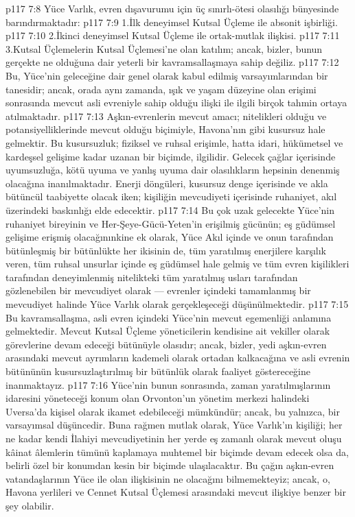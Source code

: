 \vs p117 7:8 Yüce Varlık, evren dışavurumu için üç sınırlı\hyp{}ötesi olasılığı bünyesinde barındırmaktadır:
\vs p117 7:9 1.\bibnobreakspace İlk deneyimsel Kutsal Üçleme ile absonit işbirliği.
\vs p117 7:10 2.\bibnobreakspace İkinci deneyimsel Kutsal Üçleme ile ortak\hyp{}mutlak ilişkisi.
\vs p117 7:11 3.\bibnobreakspace Kutsal Üçlemelerin Kutsal Üçlemesi’ne olan katılım; ancak, bizler, bunun gerçekte ne olduğuna dair yeterli bir kavramsallaşmaya sahip değiliz.
\vs p117 7:12 Bu, Yüce’nin geleceğine dair genel olarak kabul edilmiş varsayımlarından bir tanesidir; ancak, orada aynı zamanda, ışık ve yaşam düzeyine olan erişimi sonrasında mevcut asli evreniyle sahip olduğu ilişki ile ilgili birçok tahmin ortaya atılmaktadır.
\vs p117 7:13 Aşkın\hyp{}evrenlerin mevcut amacı; nitelikleri olduğu ve potansiyelliklerinde mevcut olduğu biçimiyle, Havona’nın gibi kusursuz hale gelmektir. Bu kusursuzluk; fiziksel ve ruhsal erişimle, hatta idari, hükümetsel ve kardeşsel gelişime kadar uzanan bir biçimde, ilgilidir. Gelecek çağlar içerisinde uyumsuzluğa, kötü uyuma ve yanlış uyuma dair olasılıkların hepsinin denenmiş olacağına inanılmaktadır. Enerji döngüleri, kusursuz denge içerisinde ve akla bütüncül taabiyette olacak iken; kişiliğin mevcudiyeti içerisinde ruhaniyet, akıl üzerindeki baskınlığı elde edecektir.
\vs p117 7:14 Bu çok uzak gelecekte Yüce’nin ruhaniyet bireyinin ve Her\hyp{}Şeye\hyp{}Gücü\hyp{}Yeten’in erişilmiş gücünün; eş güdümsel gelişime erişmiş olacağınınkine ek olarak, Yüce Akıl içinde ve onun tarafından bütünleşmiş bir bütünlükte her ikisinin de, tüm yaratılmış enerjilere karşılık veren, tüm ruhsal unsurlar içinde eş güdümsel hale gelmiş ve tüm evren kişilikleri tarafından deneyimlenmiş nitelikteki tüm yaratılmış usları tarafından gözlenebilen bir mevcudiyet olarak --- evrenler içindeki tamamlanmış bir mevcudiyet halinde Yüce Varlık olarak gerçekleşeceği düşünülmektedir.
\vs p117 7:15 Bu kavramsallaşma, asli evren içindeki Yüce’nin mevcut egemenliği anlamına gelmektedir. Mevcut Kutsal Üçleme yöneticilerin kendisine ait vekiller olarak görevlerine devam edeceği bütünüyle olasıdır; ancak, bizler, yedi aşkın\hyp{}evren arasındaki mevcut ayrımların kademeli olarak ortadan kalkacağına ve asli evrenin bütününün kusursuzlaştırılmış bir bütünlük olarak faaliyet göstereceğine inanmaktayız.
\vs p117 7:16 Yüce’nin bunun sonrasında, zaman yaratılmışlarının idaresini yöneteceği konum olan Orvonton’un yönetim merkezi halindeki Uversa’da kişisel olarak ikamet edebileceği mümkündür; ancak, bu yalnızca, bir varsayımsal düşüncedir. Buna rağmen mutlak olarak, Yüce Varlık’ın kişiliği; her ne kadar kendi İlahiyi mevcudiyetinin her yerde eş zamanlı olarak mevcut oluşu kâinat âlemlerin tümünü kaplamaya muhtemel bir biçimde devam edecek olsa da, belirli özel bir konumdan kesin bir biçimde ulaşılacaktır. Bu çağın aşkın\hyp{}evren vatandaşlarının Yüce ile olan ilişkisinin ne olacağını bilmemekteyiz; ancak, o, Havona yerlileri ve Cennet Kutsal Üçlemesi arasındaki mevcut ilişkiye benzer bir şey olabilir.
